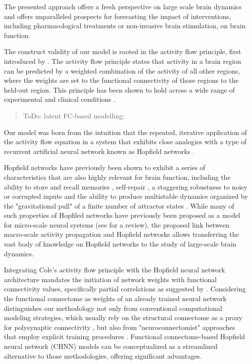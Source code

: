 \documentclass{article}
\begin{document}
The presented approach offers a fresh perspective on large scale brain dynamics and offers unparalleled prospects for forecasting the impact of interventions, including pharmacological treatments or non-invasive brain stimulation, on brain function.

The construct validity of our model is rooted in the activity flow principle, first introduced by
\citet{cole2016activity}. The activity flow principle states that activity in a brain region can be predicted by a weighted combination of the activity of all other regions, where the weights are set to the functional connectivity of those regions to the held-out region. This principle has been shown to hold across a wide range of experimental and clinical conditions
\citep{cole2016activity, ito2017cognitive, mill2022network, hearne2021activity, chen2018human}.

\begin{quote}
ToDo: latent FC-based modelling: \cite{McCormick_2022}
\end{quote}

Our model was born from the intuition that the repeated, iterative application of the activity flow equation in a system that exhibits close analogies with a type of recurrent artificial neural network known as Hopfield networks
\citep{hopfield1982neural}.

Hopfield networks have previously been shown to exhibit a series of characteristics that are also highly relevant for
brain function, including the ability to store and recall memories \citep{hopfield1982neural}, self-repair \citep{murre2003selfreparing},
a staggering robustness to noisy or corrupted inputs \citep{hertz1991introduction} and the ability to produce
multistable dynamics organized by the "gravitational pull" of a finite number of attractor states
\citep{khona2022attractor}. While many of such properties of Hopfiled networks have previously been proposed as a model for micro-scale neural systems (see \cite{khona2022attractor} for a review), the proposed link between macro-scale activity propagation and Hopfield networks allows transferring the vast body of knowledge on Hopfield networks to the study of large-scale brain dynamics.

Integrating Cole's activity flow principle with the Hopfield neural network architecture mandates the initiation of network weights with functional connectivity values, specifically partial correlations as suggested by \citet{cole2016activity}.
Considering the functional connectome as weights of an already trained neural network distinguishes our methodology not only from conventional computational modeling strategies, which usually rely on the structural connectome as a proxy for polysynaptic connectivity \citep{cabral2017functional}, but also from "neuroconnectomist" approaches that employ explicit training procedures \citep{doerig2023neuroconnectionist}.
Functional connectome-based Hopfield neural network (CHNN) models can be conceptualized as a streamlined alternative to those methodologies, offering significant advantages.
\end{document}
